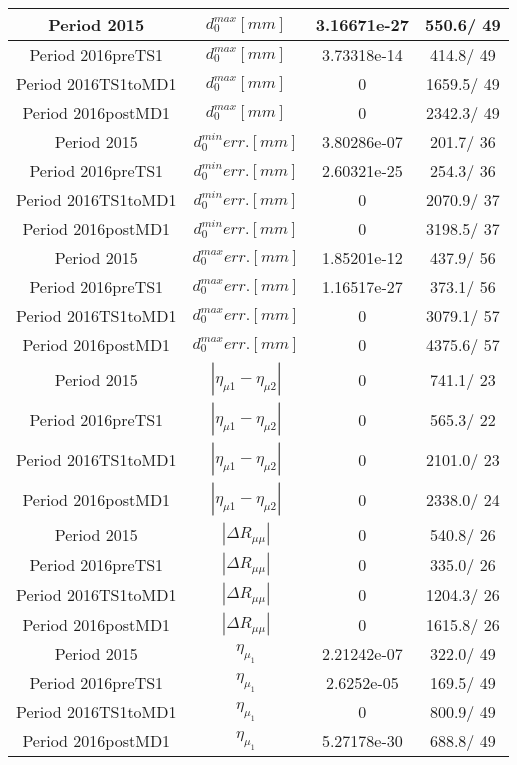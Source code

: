 \documentclass{article}
\begin{document}
\begin{longtable}{c|c|c|c}
\hline
 Period 2015 & $d_{0}^{max} [mm]$ & 3.16671e-27 & 550.6/ 49\\
\hline
 Period 2016preTS1 & $d_{0}^{max} [mm]$ & 3.73318e-14 & 414.8/ 49\\
\hline
 Period 2016TS1toMD1 & $d_{0}^{max} [mm]$ & 0 & 1659.5/ 49\\
\hline
 Period 2016postMD1 & $d_{0}^{max} [mm]$ & 0 & 2342.3/ 49\\
\hline
 Period 2015 & $d_{0}^{min} err. [mm]$ & 3.80286e-07 & 201.7/ 36\\
\hline
 Period 2016preTS1 & $d_{0}^{min} err. [mm]$ & 2.60321e-25 & 254.3/ 36\\
\hline
 Period 2016TS1toMD1 & $d_{0}^{min} err. [mm]$ & 0 & 2070.9/ 37\\
\hline
 Period 2016postMD1 & $d_{0}^{min} err. [mm]$ & 0 & 3198.5/ 37\\
\hline
 Period 2015 & $d_{0}^{max} err. [mm]$ & 1.85201e-12 & 437.9/ 56\\
\hline
 Period 2016preTS1 & $d_{0}^{max} err. [mm]$ & 1.16517e-27 & 373.1/ 56\\
\hline
 Period 2016TS1toMD1 & $d_{0}^{max} err. [mm]$ & 0 & 3079.1/ 57\\
\hline
 Period 2016postMD1 & $d_{0}^{max} err. [mm]$ & 0 & 4375.6/ 57\\
\hline
 Period 2015 & $|\eta_{\mu1}-\eta_{\mu2}|$ & 0 & 741.1/ 23\\
\hline
 Period 2016preTS1 & $|\eta_{\mu1}-\eta_{\mu2}|$ & 0 & 565.3/ 22\\
\hline
 Period 2016TS1toMD1 & $|\eta_{\mu1}-\eta_{\mu2}|$ & 0 & 2101.0/ 23\\
\hline
 Period 2016postMD1 & $|\eta_{\mu1}-\eta_{\mu2}|$ & 0 & 2338.0/ 24\\
\hline
 Period 2015 & $|\Delta R_{\mu \mu}|$ & 0 & 540.8/ 26\\
\hline
 Period 2016preTS1 & $|\Delta R_{\mu \mu}|$ & 0 & 335.0/ 26\\
\hline
 Period 2016TS1toMD1 & $|\Delta R_{\mu \mu}|$ & 0 & 1204.3/ 26\\
\hline
 Period 2016postMD1 & $|\Delta R_{\mu \mu}|$ & 0 & 1615.8/ 26\\
\hline
 Period 2015 & $\eta_{\mu_{1}}$ & 2.21242e-07 & 322.0/ 49\\
\hline
 Period 2016preTS1 & $\eta_{\mu_{1}}$ & 2.6252e-05 & 169.5/ 49\\
\hline
 Period 2016TS1toMD1 & $\eta_{\mu_{1}}$ & 0 & 800.9/ 49\\
\hline
 Period 2016postMD1 & $\eta_{\mu_{1}}$ & 5.27178e-30 & 688.8/ 49\\

\end{longtable}
\end{document}
